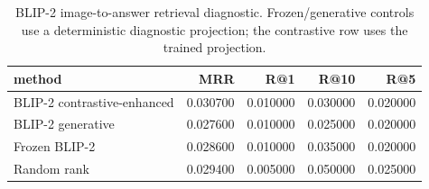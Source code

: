 \begin{table}
\caption{BLIP-2 image-to-answer retrieval diagnostic. Frozen/generative controls use a deterministic diagnostic projection; the contrastive row uses the trained projection.}
\label{tab:rq2_retrieval_old}
\begin{tabular}{lrrrr}
\toprule
method & MRR & R@1 & R@10 & R@5 \\
\midrule
BLIP-2 contrastive-enhanced & 0.030700 & 0.010000 & 0.030000 & 0.020000 \\
BLIP-2 generative & 0.027600 & 0.010000 & 0.025000 & 0.020000 \\
Frozen BLIP-2 & 0.028600 & 0.010000 & 0.035000 & 0.020000 \\
Random rank & 0.029400 & 0.005000 & 0.050000 & 0.025000 \\
\bottomrule
\end{tabular}
\end{table}
